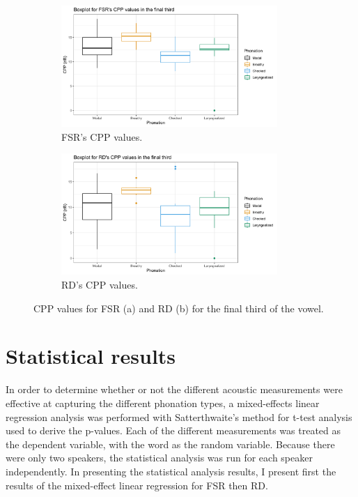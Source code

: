 \documentclass[12pt, letterpaper]{article}
\begin{document}
\begin{figure}[!ht]
	\centering
	\begin{subfigure}{.5\textwidth}
		\centering
		\includegraphics[width=0.9\textwidth]{Images/mean_FSR_cpp_third.png}
		\caption{FSR's CPP values.}
		\label{fig:FSRcppthird} 
	\end{subfigure}%
	\begin{subfigure}{.5\textwidth}
		\centering
		\includegraphics[width=0.9\textwidth]{Images/mean_RD_cpp_third.png}
		\caption{RD's CPP values.}
		\label{fig:RDcppthird} 
	\end{subfigure}
	\caption{CPP values for FSR (a) and RD (b) for the final third of the vowel. }
	\label{fig:cppthird}
\end{figure}


\section{Statistical results} \label{sec:Stats}

In order to determine whether or not the different acoustic measurements were effective at capturing the different phonation types, a mixed-effects linear regression analysis was performed with Satterthwaite's method for t-test analysis used to derive the p-values. Each of the different measurements was treated as the dependent variable, with the word as the random variable. Because there were only two speakers, the statistical analysis was run for each speaker independently. In presenting the statistical analysis results, I present first the results of the mixed-effect linear regression for FSR then RD.
\end{document}
